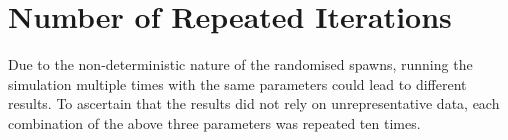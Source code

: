\section{Number of Repeated Iterations}
Due to the non-deterministic nature of the randomised spawns, running the simulation multiple times with the same parameters could lead to different results. To ascertain that the results did not rely on unrepresentative data, each combination of the above three parameters was repeated ten times.
